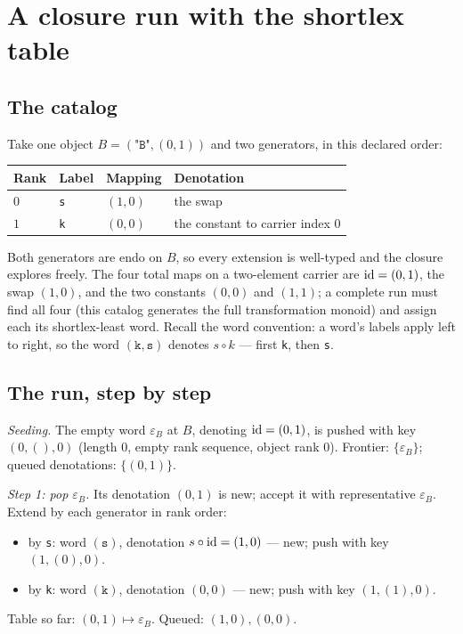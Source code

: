 \section{A closure run with the shortlex table}\label{appA:sec:closure}

\subsection{The catalog}

Take one object $B = (\texttt{"B"}, (0, 1))$ and two generators, in
this declared order:

\begin{center}
\begin{tabular}{@{}llll@{}}
\toprule
Rank & Label & Mapping & Denotation \\
\midrule
$0$ & \texttt{s} & $(1, 0)$ & the swap \\
$1$ & \texttt{k} & $(0, 0)$ & the constant to carrier index $0$ \\
\bottomrule
\end{tabular}
\end{center}

Both generators are endo on $B$, so every extension is well-typed and
the closure explores freely. The four total maps on a two-element
carrier are $\mathrm{id} = (0,1)$, the swap $(1,0)$, and the two constants
$(0,0)$ and $(1,1)$; a complete run must find all four (this catalog
generates the full transformation monoid) and assign each its
shortlex-least word. Recall the word convention: a word's labels apply
left to right, so the word $(\texttt{k}, \texttt{s})$ denotes
$s \circ k$ --- first \texttt{k}, then \texttt{s}.

\subsection{The run, step by step}

\emph{Seeding.} The empty word $\varepsilon_B$ at $B$, denoting
$\mathrm{id} = (0,1)$, is pushed with key $(0, (), 0)$ (length $0$, empty rank
sequence, object rank $0$). Frontier: $\{\varepsilon_B\}$; queued
denotations: $\{(0,1)\}$.

\emph{Step 1: pop $\varepsilon_B$.} Its denotation $(0,1)$ is new;
accept it with representative $\varepsilon_B$. Extend by each
generator in rank order:
\begin{itemize}
\item by \texttt{s}: word $(\texttt{s})$, denotation
      $s \circ \mathrm{id} = (1,0)$ --- new; push with key $(1, (0), 0)$.
\item by \texttt{k}: word $(\texttt{k})$, denotation $(0,0)$ --- new;
      push with key $(1, (1), 0)$.
\end{itemize}
Table so far: $(0,1) \mapsto \varepsilon_B$. Queued: $(1,0), (0,0)$.

